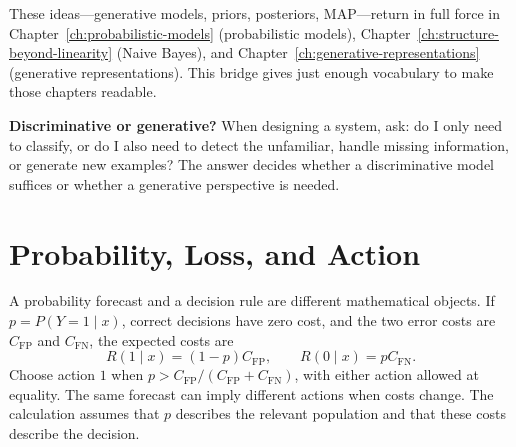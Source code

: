 These ideas---generative models, priors, posteriors, MAP---return in full force in Chapter~\ref{ch:probabilistic-models} (probabilistic models), Chapter~\ref{ch:structure-beyond-linearity} (Naive Bayes), and Chapter~\ref{ch:generative-representations} (generative representations). This bridge gives just enough vocabulary to make those chapters readable.

\textbf{Discriminative or generative?} When designing a system, ask: do I only need to classify, or do I also need to detect the unfamiliar, handle missing information, or generate new examples? The answer decides whether a discriminative model suffices or whether a generative perspective is needed.

\section{Probability, Loss, and Action}

A probability forecast and a decision rule are different mathematical objects. If $p=P(Y=1\mid x)$, correct decisions have zero cost, and the two error costs are $C_{\mathrm{FP}}$ and $C_{\mathrm{FN}}$, the expected costs are
\[
R(1\mid x)=(1-p)C_{\mathrm{FP}},\qquad
R(0\mid x)=pC_{\mathrm{FN}}.
\]
Choose action $1$ when $p>C_{\mathrm{FP}}/(C_{\mathrm{FP}}+C_{\mathrm{FN}})$, with either action allowed at equality. The same forecast can imply different actions when costs change. The calculation assumes that $p$ describes the relevant population and that these costs describe the decision.

